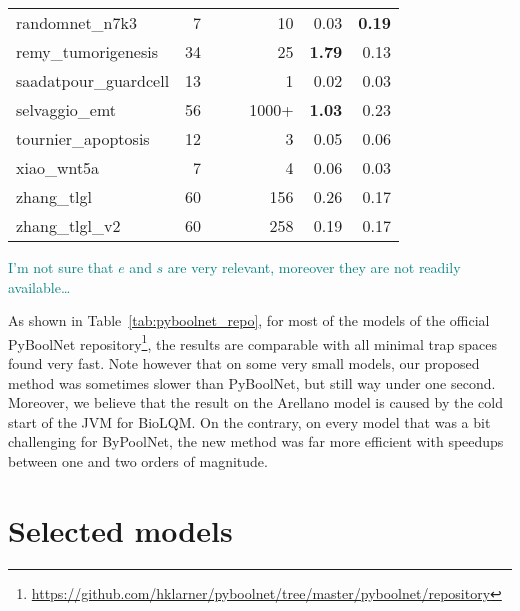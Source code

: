 \documentclass[runningheads]{llncs}
\newcommand{\sylvain}[1]{\textcolor{teal}{#1}}
\begin{document}
\begin{table}[!htb]
\begin{tabular}{lrrrrrr}
    randomnet\_n7k3 & 7 &&& 10 & 0.03 & \textbf{0.19}\\
    remy\_tumorigenesis & 34 &&& 25 & \textbf{1.79} & 0.13\\
    saadatpour\_guardcell & 13 &&& 1 & 0.02 & 0.03\\
    selvaggio\_emt & 56 &&& 1000+ & \textbf{1.03} & 0.23\\
    tournier\_apoptosis & 12 &&& 3 & 0.05 & 0.06\\
    xiao\_wnt5a & 7 &&& 4 & 0.06 & 0.03\\
    zhang\_tlgl & 60 &&& 156 & 0.26 & 0.17\\
    zhang\_tlgl\_v2 & 60 &&& 258 & 0.19 & 0.17\\
    \bottomrule
  \end{tabular}
\end{table}

  \sylvain{I'm not sure that \(e\) and \(s\) are very relevant, moreover they are not readily available\dots}

As shown in Table~\ref{tab:pyboolnet_repo}, for most of the models of the official PyBoolNet repository\footnote{\url{https://github.com/hklarner/pyboolnet/tree/master/pyboolnet/repository}}, the results are comparable with all minimal trap spaces found very fast.
Note however that on some very small models, our proposed method was sometimes slower than PyBoolNet, but still way under one second.
Moreover, we believe that the result on the Arellano model is caused by the cold start of the JVM for BioLQM.
On the contrary, on every model that was a bit challenging for ByPoolNet, the new method was far more efficient with speedups between one and two orders of magnitude.

\section{Selected models}
\end{document}
